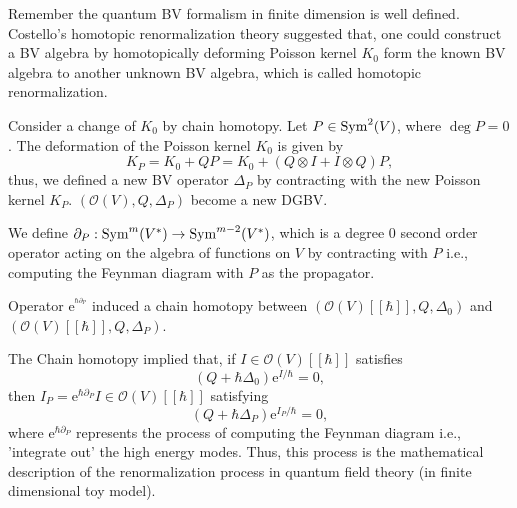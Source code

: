 \documentclass[10pt]{article}
\begin{document}
Remember the quantum BV formalism in finite dimension is well defined.
Costello's homotopic renormalization theory suggested that, one could construct a BV algebra by homotopically deforming Poisson kernel $ K_0$ form the known BV algebra to another unknown BV algebra, which is called homotopic renormalization.

Consider a change of $ K_0$ by chain homotopy.
Let $ P \in \operatorname{Sym}^{2}(V)$, where $\deg P = 0$.
The deformation of the Poisson kernel $ K_0$ is given by
\begin{equation*}
  K_{P} = K_0 + Q P = K_0 + \left( Q \otimes I + I \otimes Q \right) P,
\end{equation*}
thus, we defined a new BV operator $ \Delta_{P}$ by contracting with the new Poisson kernel $ K_{P}$.
$\left( \mathcal{O}(V), Q, \Delta_{P} \right)$ become a new DGBV.

We define $\partial_{P}: \operatorname{Sym}^{m}(V^{*}) \rightarrow \operatorname{Sym}^{m-2}(V^{*})$, which is a degree $ 0$ second order operator acting on the algebra of functions on $ V$ by contracting with $ P$ i.e., computing the Feynman diagram with $ P$ as the propagator.
\begin{proposition}
  Operator $ \mathrm{e}^{^{\hbar \partial_{P}}}$ induced a chain homotopy between $\left( \mathcal{O}(V)[[\hbar]], Q, \Delta_0 \right)$ and $\left( \mathcal{O}(V)[[\hbar]], Q, \Delta_{P} \right)$.
\end{proposition}
The Chain homotopy implied that, if $ I \in \mathcal{O}(V)[[\hbar]]$ satisfies
\begin{equation*}
  (Q + \hbar \Delta_0) \mathrm{e}^{I / \hbar} = 0,
\end{equation*}
then $ I_{P} = \mathrm{e}^{\hbar \partial_{P}} I \in \mathcal{O}(V)[[\hbar]]$ satisfying
\begin{equation*}
  \left( Q + \hbar \Delta_{P} \right) \mathrm{e}^{I_{P} / \hbar} = 0,
\end{equation*}
where $ \mathrm{e}^{\hbar \partial_{P}}$ represents the process of computing the Feynman diagram i.e., 'integrate out' the high energy modes. Thus, this process is the mathematical description of the renormalization process in quantum field theory (in finite dimensional toy model).
\end{document}
